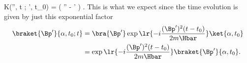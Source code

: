 {{K(\Bp'', t ; \Bp', t_0)
=
\delta( \Bp'' - \Bp' )
\exp{}.
}
%
This is what we expect since the time evolution is given by just this exponential factor
%
\begin{equation}\label{eqn:freeParticlePropagator:220}
\begin{aligned}
\braket{\Bp'}{\alpha, t_0 ; t}
&= \bra{\Bp'} \exp\lr{ -i \frac{(\Bp')^2 (t -t_0)}{2 m \Hbar}} \ket{\alpha, t_0} \\
&=
\exp\lr{ -i \frac{(\Bp')^2 (t -t_0)}{2 m \Hbar}}
\braket{\Bp'}
{\alpha, t_0}.
\end{aligned}
\end{equation}
%
} %


